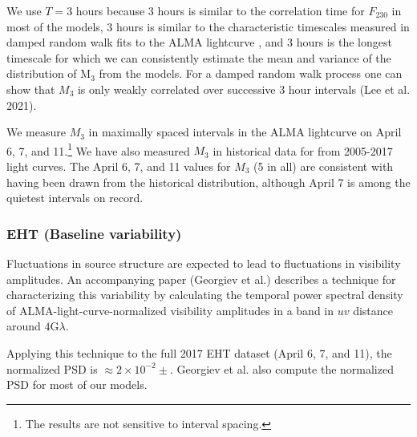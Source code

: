 We use $T = 3$ hours because 3 hours is similar to the correlation time for $F_{230}$ in most of the models, 3 hours is similar to the characteristic timescales measured in damped random walk fits to the ALMA lightcurve \citep[see Table 10 of][]{Wielgus2022}, and 3 hours is the longest timescale for which we can consistently estimate the mean and variance of the distribution of M$_3$ from the models.  For a damped random walk process one can show that $M_3$ is only weakly correlated over successive 3 hour intervals (Lee et al. 2021).

We measure $M_3$ in maximally spaced intervals in the ALMA lightcurve on April 6, 7, and 11.\footnote{The results are not sensitive to interval spacing.}  We have also measured $M_3$ in historical data for \sgra from 2005-2017 light curves.  The April 6, 7, and 11 values for $M_3$ (5 in all) are consistent with having been drawn from the historical distribution, although April 7 is among the quietest intervals on record.


\subsubsection{EHT (Baseline variability)}


Fluctuations in source structure are expected to lead to fluctuations in visibility amplitudes.  An accompanying paper  (Georgiev et al.) describes a technique for characterizing this variability by calculating the temporal power spectral density of ALMA-light-curve-normalized visibility amplitudes in a band in $uv$ distance around $4$G$\lambda$.

Applying this technique to the full 2017 EHT dataset (April 6, 7, and 11), the normalized PSD is $\approx 2 \times 10^{-2} \pm $.
Georgiev et al. also compute the normalized PSD for most of our models.
